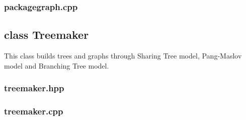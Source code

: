 \subsubsection{packagegraph.cpp}

\vspace{0.5cm}

\subsection{class Treemaker}
This class builds trees and graphs through Sharing Tree model, Pang-Maslov model and Branching Tree model.
\subsubsection{treemaker.hpp}

\vspace{0.5cm}
\subsubsection{treemaker.cpp}

\vspace{0.5cm}

